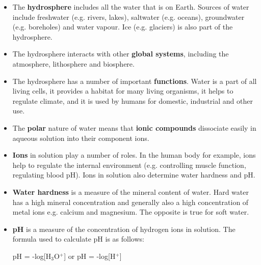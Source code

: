 \begin{itemize}
\item{The \textbf{hydrosphere} includes all the water that is on Earth. Sources of water include freshwater (e.g. rivers, lakes), saltwater (e.g. oceans), groundwater (e.g. boreholes) and water vapour. Ice (e.g. glaciers) is also part of the hydrosphere.}
\item{The hydrosphere interacts with other \textbf{global systems}, including the atmosphere, lithosphere and biosphere.}
\item{The hydrosphere has a number of important \textbf{functions}. Water is a part of all living cells, it provides a habitat for many living organisms, it helps to regulate climate, and it is used by humans for domestic, industrial and other use.}
\item{The \textbf{polar} nature of water means that \textbf{ionic compounds} dissociate easily in aqueous solution into their component ions.}
\item{\textbf{Ions} in solution play a number of roles. In the human body for example, ions help to regulate the internal environment (e.g. controlling muscle function, regulating blood pH). Ions in solution also determine water hardness and pH.}
\item{\textbf{Water hardness} is a measure of the mineral content of water. Hard water has a high mineral concentration and generally also a high concentration of metal ions e.g. calcium and magnesium. The opposite is true for soft water.}
\item{\textbf{pH} is a measure of the concentration of hydrogen ions in solution. The formula used to calculate pH is as follows:

\begin{center}
pH = -log[H$_{3}$O$^{+}$] or pH = -log[H$^{+}$]
\end{center}

}
\end{itemize}
